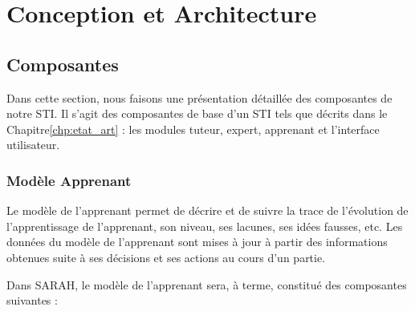 
\chapter{Conception et Architecture}
\label{chp:models}


\section{Composantes}

Dans cette section, nous faisons une présentation détaillée des composantes de notre STI. Il s'agit des composantes de base d'un STI tels que décrits dans le Chapitre\ref{chp:etat_art} : les modules tuteur, expert, apprenant et l'interface utilisateur.

\subsection{Modèle Apprenant}   
Le modèle de l'apprenant permet de décrire et de suivre la trace de l'évolution de l'apprentissage de l'apprenant, son niveau, ses lacunes, ses idées fausses, etc. Les données du modèle de l'apprenant sont mises à jour à partir des informations obtenues suite à ses décisions et ses actions au cours d'un partie.
 
  Dans SARAH, le modèle de l'apprenant sera, à terme, constitué des composantes suivantes :
 
